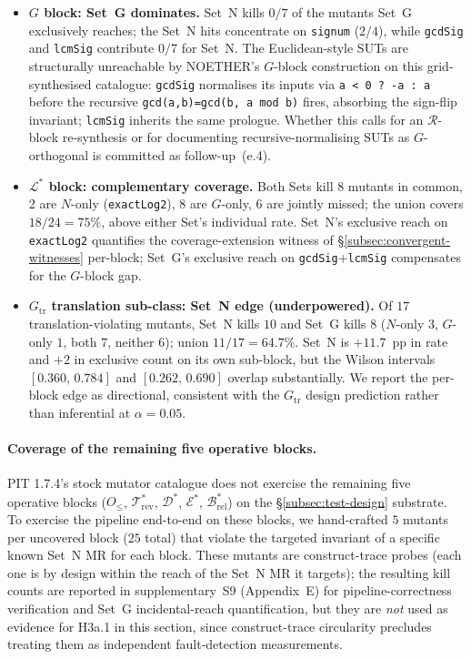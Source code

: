 \documentclass[manuscript]{acmart}
\begin{document}
\begin{itemize}[nosep,leftmargin=*]
\item \textbf{$G$ block: Set~G dominates.} Set~N kills $0/7$ of the mutants Set~G exclusively reaches; the Set~N hits concentrate on \texttt{signum} ($2/4$), while \texttt{gcdSig} and \texttt{lcmSig} contribute $0/7$ for Set~N. The Euclidean-style SUTs are structurally unreachable by NOETHER's $G$-block construction on this grid-synthesised catalogue: \texttt{gcdSig} normalises its inputs via \texttt{a < 0 ? -a : a} before the recursive \texttt{gcd(a,b)=gcd(b, a\,mod\,b)} fires, absorbing the sign-flip invariant; \texttt{lcmSig} inherits the same prologue. Whether this calls for an $\mathcal{R}$-block re-synthesis or for documenting recursive-normalising SUTs as $G$-orthogonal is committed as follow-up~(e.4).

\item \textbf{$\mathcal{L}^{*}$ block: complementary coverage.} Both Sets kill 8 mutants in common, 2 are $N$-only (\texttt{exactLog2}), 8 are $G$-only, 6 are jointly missed; the union covers $18/24 = 75\%$, above either Set's individual rate. Set~N's exclusive reach on \texttt{exactLog2} quantifies the coverage-extension witness of \S\ref{subsec:convergent-witnesses} per-block; Set~G's exclusive reach on \texttt{gcdSig}+\texttt{lcmSig} compensates for the $G$-block gap.

\item \textbf{$G_{\mathrm{tr}}$ translation sub-class: Set~N edge (underpowered).} Of $17$ translation-violating mutants, Set~N kills $10$ and Set~G kills $8$ ($N$-only $3$, $G$-only $1$, both $7$, neither $6$); union $11/17 = 64.7\%$. Set~N is $+11.7$~pp in rate and $+2$ in exclusive count on its own sub-block, but the Wilson intervals $[0.360,\,0.784]$ and $[0.262,\,0.690]$ overlap substantially. We report the per-block edge as directional, consistent with the $G_{\mathrm{tr}}$ design prediction rather than inferential at $\alpha = 0.05$.
\end{itemize}

\paragraph{Coverage of the remaining five operative blocks.}
\label{para:augmented-stratum-pointer}
PIT 1.7.4's stock mutator catalogue does not exercise the remaining
five operative blocks ($O_{\le}$, $\mathcal{T}^{*}_{\mathrm{rev}}$,
$\mathcal{D}^{*}$, $\mathcal{E}^{*}$,
$\mathcal{B}^{*}_{\mathrm{rel}}$) on the
\S\ref{subsec:test-design} substrate. To exercise the pipeline
end-to-end on these blocks, we hand-crafted $5$ mutants per
uncovered block ($25$ total) that violate the targeted invariant of
a specific known Set~N MR for each block. These mutants are
construct-trace probes (each one is by design within the reach of
the Set~N MR it targets); the resulting kill counts are reported in
supplementary~S9 (Appendix~E) for pipeline-correctness
verification and Set~G incidental-reach quantification, but they are
\emph{not} used as evidence for H3a.1 in this section, since
construct-trace circularity precludes treating them as independent
fault-detection measurements.
\end{document}
